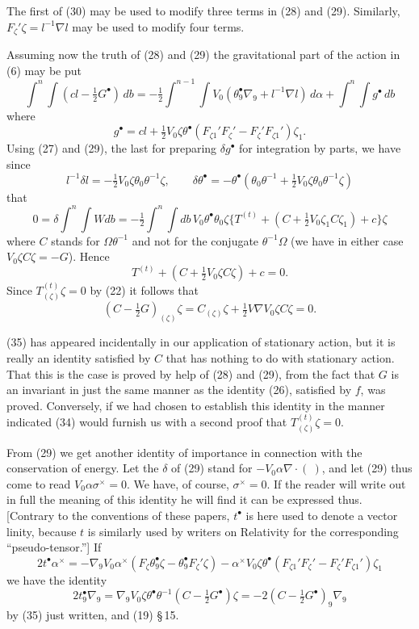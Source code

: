\documentclass[11pt]{article}
\begin{document}
\indent The first of (30) may be used to modify three terms in (28) and (29). Similarly, $F_\zeta'\zeta=l^{-1}\nabla l$ may be used to modify four terms.

\indent Assuming now the truth of (28) and (29) the gravitational part of the action in (6) may be put
\[
  \int^n\!\int(cl-\tfrac12G^\bullet)\,db=-\tfrac12\int^{n-1}\!\int V_0(\theta^\bullet_9\nabla_9+l^{-1}\nabla l)\,d\alpha+\int^n\!\int g^\bullet\,db
  \tag{31}
\]
where
\[
  g^\bullet=cl+\tfrac12V_0\zeta\theta^\bullet(F_{\zeta1}'F_\zeta'-F_\zeta'F_{\zeta1}')\zeta_1.
  \tag{32}
\]
Using (27) and (29), the last for preparing $\delta g^\bullet$ for integration by parts, we have since
\[
  l^{-1}\delta l=-\tfrac12V_0\zeta\theta_0\theta^{-1}\zeta,\qquad
  \delta\theta^\bullet=-\theta^\bullet(\theta_0\theta^{-1}+\tfrac12V_0\zeta\theta_0\theta^{-1}\zeta)
  \tag{33}
\]
that
\[
  0=\delta\int^n\!\int Wdb=-\tfrac12\int^n\!\int db\,V_0\theta^\bullet\theta_0\zeta\{T^{(t)}+(C+\tfrac12V_0\zeta_1C\zeta_1)+c\}\zeta
\]
where $C$ stands for $\Omega\theta^{-1}$ and not for the conjugate $\theta^{-1}\Omega$ (we have in either case $V_0\zeta C\zeta=-G$). Hence
\[
  T^{(t)}+(C+\tfrac12V_0\zeta C\zeta)+c=0.
  \tag{34}
\]
Since $T_{(\zeta)}^{(t)}\zeta=0$ by (22) it follows that
\[
  (C-\tfrac12G)_{(\zeta)}\zeta=C_{(\zeta)}\zeta+\tfrac12V\nabla V_0\zeta C\zeta=0.
  \tag{35}
\]


\indent (35) has appeared incidentally in our application of stationary action, but it is really an identity satisfied by $C$ that has nothing to do with stationary action. That this is the case is proved by help of (28) and (29), from the fact that $G$ is an invariant in just the same manner as the identity (26), satisfied by $f$, was proved. Conversely, if we had chosen to establish this identity in the manner indicated (34) would furnish us with a second proof that $T_{(\zeta)}^{(t)}\zeta=0$.

\indent From (29) we get another identity of importance in connection with the conservation of energy. Let the $\delta$ of (29) stand for $-V_0\alpha\nabla\mathbin{\cdot}(\ )$, and let (29) thus come to read $V_0\alpha\sigma^\times=0$. We have, of course, $\sigma^\times=0$. If the reader will write out in full the meaning of this identity he will find it can be expressed thus. [Contrary to the conventions of these papers, $t^\bullet$ is here used to denote a vector linity, because $t$ is similarly used by writers on Relativity for the corresponding ``pseudo-tensor.''] If
\[
  2t^\bullet\alpha^\times=-\nabla_9V_0\alpha^\times(F_\zeta\theta^\bullet_9\zeta-\theta^\bullet_9F_\zeta'\zeta)-\alpha^\times V_0\zeta\theta^\bullet(F_{\zeta1}'F_\zeta'-F_\zeta'F_{\zeta1}')\zeta_1
  \tag{36}
\]
we have the identity
\[
  2t^\bullet_9\nabla_9=\nabla_9V_0\zeta\theta^\bullet\theta^{-1}(C-\tfrac12G^\bullet)\zeta=-2(C-\tfrac12G^\bullet)_9\nabla_9
  \tag{37}
\]
by (35) just written, and (19) \S\,15.
\end{document}
